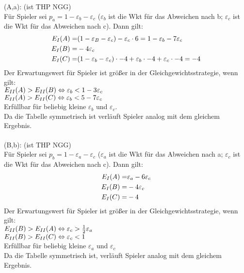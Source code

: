 \documentclass[a4paper, 11pt]{article}
\newcommand{\RM}[1]{\MakeUppercase{\romannumeral #1}}
\begin{document}
(A,a): (ist THP NGG)\\
Für Spieler \RM{1} sei $p_a = 1- \varepsilon_b - \varepsilon_c$ ($\varepsilon_b$ ist die Wkt für das Abweichen nach b; $\varepsilon_c$ ist die Wkt für das Abweichen nach c). Dann gilt:\\
\begin{align*}
E_\RM{1}(A) = & (1-\varepsilon_B-\varepsilon_c) - \varepsilon_c \cdot 6 = 1 - \varepsilon_b - 7\varepsilon_c\\
E_\RM{1}(B) = & - 4\varepsilon_c\\
E_\RM{1}(C) = & (1-\varepsilon_b-\varepsilon_c) \cdot -4 + \varepsilon_b \cdot -4 + \varepsilon_c \cdot -4 = -4
\end{align*}
Der Erwartungswert für Spieler \RM{1} ist größer in der Gleichgewichtsstrategie, wenn gilt:\\
$E_\RM{2}(A) > E_\RM{2}(B) \Leftrightarrow \varepsilon_b < 1 - 3\varepsilon_c$\\
$E_\RM{2}(A) > E_\RM{2}(C) \Leftrightarrow \varepsilon_b < 5 - 7\varepsilon_c$\\
Erfüllbar für beliebig kleine $\varepsilon_b$ und $\varepsilon_c$.\\
Da die Tabelle symmetrisch ist verläuft Spieler \RM{2} analog mit dem gleichem Ergebnis. \\
\\
(B,b): (ist THP NGG)\\
Für Spieler \RM{1} sei $p_b = 1- \varepsilon_a - \varepsilon_c$ ($\varepsilon_a$ ist die Wkt für das Abweichen nach a; $\varepsilon_c$ ist die Wkt für das Abweichen nach c). Dann gilt:\\
\begin{align*}
E_\RM{1}(A) = & \varepsilon_a - 6\varepsilon_c\\
E_\RM{1}(B) = & -4\varepsilon_c\\
E_\RM{1}(C) = & -4
\end{align*} 
Der Erwartungswert für Spieler \RM{1} ist größer in der Gleichgewichtsstrategie, wenn gilt:\\
$E_\RM{2}(B) > E_\RM{2}(A) \Leftrightarrow \varepsilon_c > \frac{1}{2}\varepsilon_a$\\
$E_\RM{2}(B) > E_\RM{2}(C) \Leftrightarrow \varepsilon_c < 1$\\
Erfüllbar für beliebig kleine $\varepsilon_a$ und $\varepsilon_c$\\
Da die Tabelle symmetrisch ist, verläuft Spieler \RM{2} analog mit dem gleichem Ergebnis.\\
\\
\end{document}
